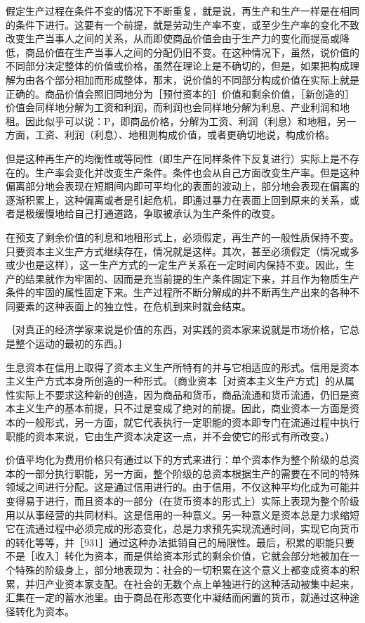 假定生产过程在条件不变的情况下不断重复，就是说，再生产和生产一样是在相同的条件下进行。这要有一个前提，就是劳动生产率不变，或至少生产率的变化不致改变生产当事人之间的关系，从而即使商品价值会由于生产力的变化而提高或降低，商品价值在生产当事人之间的分配仍旧不变。在这种情况下，虽然，说价值的不同部分决定整体的价值或价格，虽然在理论上是不确切的，但是，如果把构成理解为由各个部分相加而形成整体，那末，说价值的不同部分构成价值在实际上就是正确的。商品价值会照旧同地分为［预付资本的］价值和剩余价值，［新创造的］价值会同样地分解为工资和利润，而利润也会同样地分解为利息、产业利润和地租。因此似乎可以说：P，即商品价格，分解为工资、利润（利息）和地租，另一方面，工资、利润（利息）、地租则构成价值，或者更确切地说，构成价格。

但是这种再生产的均衡性或等同性（即生产在同样条件下反复进行）实际上是不存在的。生产率会变化并改变生产条件。条件也会从自己方面改变生产率。但是这种偏离部分地会表现在短期间内即可平均化的表面的波动上，部分地会表现在偏离的逐渐积累上，这种偏离或者是引起危机，即通过暴力在表面上回到原来的关系，或者是极缓慢地给自己打通道路，争取被承认为生产条件的改变。

在预支了剩余价值的利息和地租形式上，必须假定，再生产的一般性质保持不变。只要资本主义生产方式继续存在，情况就是这样。其次，甚至必须假定（情况或多或少也是这样），这一生产方式的一定生产关系在一定时间内保持不变。因此，生产的结果就作为牢固的、因而是充当前提的生产条件固定下来，并且作为物质生产条件的牢固的属性固定下来。生产过程所不断分解成的并不断再生产出来的各种不同要素的这种表面上的独立性，在危机到来时就会结束。

｛对真正的经济学家来说是价值的东西，对实践的资本家来说就是市场价格，它总是整个运动的最初的东西。｝

生息资本在信用上取得了资本主义生产所特有的并与它相适应的形式。信用是资本主义生产方式本身所创造的一种形式。（商业资本［对资本主义生产方式］的从属性实际上不要求这种新的创造，因为商品和货币，商品流通和货币流通，仍旧是资本主义生产的基本前提，只不过是变成了绝对的前提。因此，商业资本一方面是资本的一般形式，另一方面，就它代表执行一定职能的资本即专门在流通过程中执行职能的资本来说，它由生产资本决定这一点，并不会使它的形式有所改变。）

价值平均化为费用价格只有通过以下的方式来进行：单个资本作为整个阶级的总资本的一部分执行职能，另一方面，整个阶级的总资本根据生产的需要在不同的特殊领域之间进行分配。这是通过信用进行的。由于信用，不仅这种平均化成为可能并变得易于进行，而且资本的一部分（在货币资本的形式上）实际上表现为整个阶级用以从事经营的共同材料。这是信用的一种意义。另一种意义是资本总是力求缩短它在流通过程中必须完成的形态变化，总是力求预先实现流通时间，实现它向货币的转化等等，并［931］通过这种办法抵销自己的局限性。最后，积累的职能只要不是［收入］转化为资本，而是供给资本形式的剩余价值，它就会部分地被加在一个特殊的阶级身上，部分地表现为：社会的一切积累在这个意义上都变成资本的积累，并归产业资本家支配。在社会的无数个点上单独进行的这种活动被集中起来，汇集在一定的蓄水池里。由于商品在形态变化中凝结而闲置的货币，就通过这种途径转化为资本。

